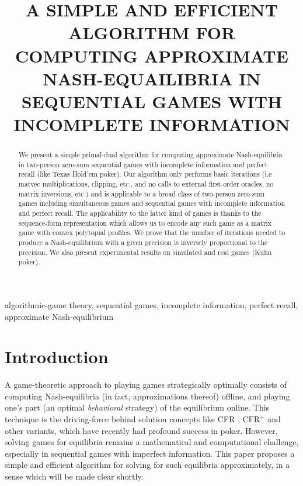 \documentclass[a4paper,9pt]{extarticle}
\title{A SIMPLE AND EFFICIENT ALGORITHM FOR COMPUTING APPROXIMATE
  NASH-EQUAILIBRIA IN SEQUENTIAL GAMES WITH INCOMPLETE INFORMATION}
\begin{document}
\maketitle
\begin{abstract}
We present a simple primal-dual algorithm for
  computing approximate Nash-equilibria in two-person zero-sum
  sequential games with  incomplete information and perfect recall
  (like Texas Hold'em poker). Our algorithm only performs basic
  iterations (i.e matvec multiplications, clipping, etc., and no calls
  to external first-order oracles, no matrix inversions, etc.)
  and is applicable to a broad class of two-person zero-sum games
  including simultaneous games and sequential games with incomplete
  information and perfect recall. The applicability to the latter kind
  of games is thanks to the sequence-form representation
  \cite{koller1992complexity} which allows us to encode any such game
  as a matrix game with convex polytopial profiles. We prove that
  the number of iterations needed to produce a Nash-equilibrium with a
  given precision is inversely proportional to the
  precision. We also present experimental results on simulated and
  real games (Kuhn poker).
\end{abstract}

\begin{keywords} algorithmic-game theory, sequential games,
incomplete information, perfect recall, approximate Nash-equilibrium
\end{keywords}

\section{Introduction}
\label{sec:intro}
A game-theoretic approach to playing games strategically optimally
consists of computing Nash-equilibria (in fact, approximations thereof)
offline, and playing one's part (an optimal \textit{behavioral}
strategy) of the equilibrium online. This
technique is the driving-force behind solution concepts like CFR
\cite{zinkevich2008regret,lanctot2009monte,Bowling09012015},
$\text{CFR}^{+}$ \cite{tammelin14} and other variants, which
have recently had profound success in poker. However, solving games
for equilibria remains a mathematical and computational challenge,
especially in sequential games with imperfect information. This paper
proposes a simple and efficient algorithm for solving for such
equilibria approximately, in a sense which will be made clear shortly.
\end{document}
